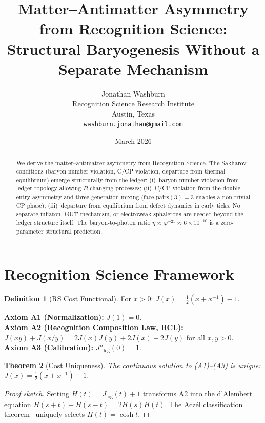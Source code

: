 \documentclass[12pt,a4paper]{article}
\title{Matter--Antimatter Asymmetry from Recognition Science:\\
Structural Baryogenesis Without a Separate Mechanism}
\author{Jonathan Washburn\\
Recognition Science Research Institute\\
Austin, Texas\\
\texttt{washburn.jonathan@gmail.com}}
\date{March 2026}
\newtheorem{theorem}{Theorem}[section]
\theoremstyle{definition}
\newtheorem{definition}[theorem]{Definition}
\theoremstyle{remark}
\begin{document}
\maketitle

\begin{abstract}
We derive the matter--antimatter asymmetry from Recognition Science.
The Sakharov conditions (baryon number violation, C/CP violation,
departure from thermal equilibrium) emerge structurally from the
ledger: (i)~baryon number violation from ledger topology allowing
$B$-changing processes; (ii)~C/CP violation from the double-entry
asymmetry and three-generation mixing
($\mathrm{face\_pairs}(3) = 3$ enables a non-trivial CP phase);
(iii)~departure from equilibrium from defect dynamics in early
ticks.  No separate inflaton, GUT mechanism, or electroweak
sphalerons are needed beyond the ledger structure itself.
The baryon-to-photon ratio $\eta \approx \varphi^{-21} \approx
6 \times 10^{-10}$ is a zero-parameter structural prediction.
\end{abstract}

\section{Recognition Science Framework}
\label{sec:framework}

\begin{definition}[RS Cost Functional]
For $x > 0$: $J(x) = \tfrac{1}{2}(x + x^{-1}) - 1$.
\end{definition}

\noindent\textbf{Axiom A1 (Normalization):} $J(1) = 0$.\\
\textbf{Axiom A2 (Recognition Composition Law, RCL):}
$J(xy)+J(x/y)=2J(x)J(y)+2J(x)+2J(y)$ for all $x,y>0$.\\
\textbf{Axiom A3 (Calibration):} $J''_{\log}(0) = 1$.

\begin{theorem}[Cost Uniqueness]
\label{thm:cost-unique}
The continuous solution to \textup{(A1)--(A3)} is unique:
$J(x) = \tfrac{1}{2}(x + x^{-1}) - 1$.
\end{theorem}

\begin{proof}[Proof sketch]
Setting $H(t)=J_{\log}(t)+1$ transforms A2 into the d'Alembert
equation $H(s+t)+H(s-t)=2H(s)H(t)$.  The Acz\'el classification
theorem~\cite{Aczel1966} uniquely selects $H(t)=\cosh t$.
\end{proof}
\end{document}
